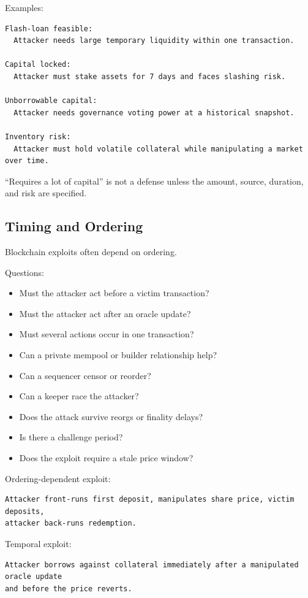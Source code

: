 Examples:

\begin{lstlisting}
Flash-loan feasible:
  Attacker needs large temporary liquidity within one transaction.

Capital locked:
  Attacker must stake assets for 7 days and faces slashing risk.

Unborrowable capital:
  Attacker needs governance voting power at a historical snapshot.

Inventory risk:
  Attacker must hold volatile collateral while manipulating a market over time.
\end{lstlisting}

``Requires a lot of capital'' is not a defense unless the amount,
source, duration, and risk are specified.

\subsection{Timing and Ordering}

Blockchain exploits often depend on ordering.

Questions:

\begin{itemize}
\tightlist
\item
  Must the attacker act before a victim transaction?
\item
  Must the attacker act after an oracle update?
\item
  Must several actions occur in one transaction?
\item
  Can a private mempool or builder relationship help?
\item
  Can a sequencer censor or reorder?
\item
  Can a keeper race the attacker?
\item
  Does the attack survive reorgs or finality delays?
\item
  Is there a challenge period?
\item
  Does the exploit require a stale price window?
\end{itemize}

Ordering-dependent exploit:

\begin{lstlisting}
Attacker front-runs first deposit, manipulates share price, victim deposits,
attacker back-runs redemption.
\end{lstlisting}

Temporal exploit:

\begin{lstlisting}
Attacker borrows against collateral immediately after a manipulated oracle update
and before the price reverts.
\end{lstlisting}

